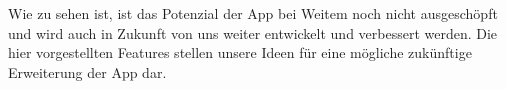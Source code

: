 \documentclass[titlepage, a4paper, 11pt]{scrartcl}
\begin{document}
        Wie zu sehen ist, ist das Potenzial der App bei Weitem noch nicht ausgeschöpft und wird auch in Zukunft von uns weiter entwickelt und verbessert werden. 
        Die hier vorgestellten Features stellen unsere Ideen für eine mögliche zukünftige Erweiterung der App dar.

          
  
\end{document}
